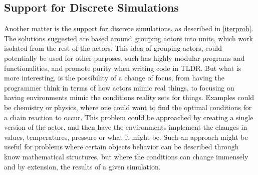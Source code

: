 \subsection{Support for Discrete Simulations}

Another matter is the support for discrete simulations, as described in \cref{iterprob}. The solutions suggested are based around grouping actors into units, which work isolated from the rest of the actors. This idea of grouping actors, could potentially be used for other purposes, such has highly modular programs and functionalities, and promote purity when writing code in TLDR. But what is more interesting, is the possibility of a change of focus, from having the programmer think in terms of how actors mimic real things, to focusing on having environments mimic the conditions reality sets for things. Examples could be chemistry or physics, where one could want to find the optimal conditions for a chain reaction to occur. This problem could be approached by creating a single version of the actor, and then have the environments implement the changes in values, temperatures, pressure or what it might be. Such an approach might be useful for problems where certain objects behavior can be described through know mathematical structures, but where the conditions can change immensely and by extension, the results of a given simulation.